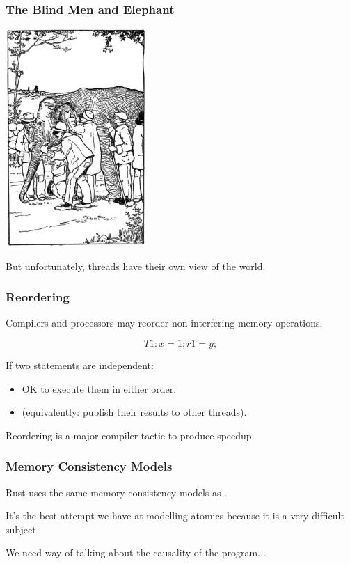 \begin{frame}
\frametitle{The Blind Men and Elephant}

\begin{center}
	\includegraphics[width=0.4\textwidth]{images/Blind_men_and_elephant.jpg}
\end{center}

But unfortunately, threads have their own view of the world.

\end{frame}

\begin{frame}
  \frametitle{Reordering}

  
     Compilers and processors may reorder non-interfering memory
     operations.

      \[ T1: x = 1; r1 = y; \]

     If two statements are independent:
     \begin{itemize}
        \item OK to execute them in either order.
        \item (equivalently: publish their results to other threads).
     \end{itemize}

     Reordering is a major compiler tactic to produce speedup.
  
\end{frame}


\begin{frame}
  \frametitle{Memory Consistency Models}

Rust uses the same memory consistency models as \CPP.

It's the best attempt we have at modelling atomics because it is a very difficult subject

We need way of talking about the \alert{causality} of the program...


\end{frame}

